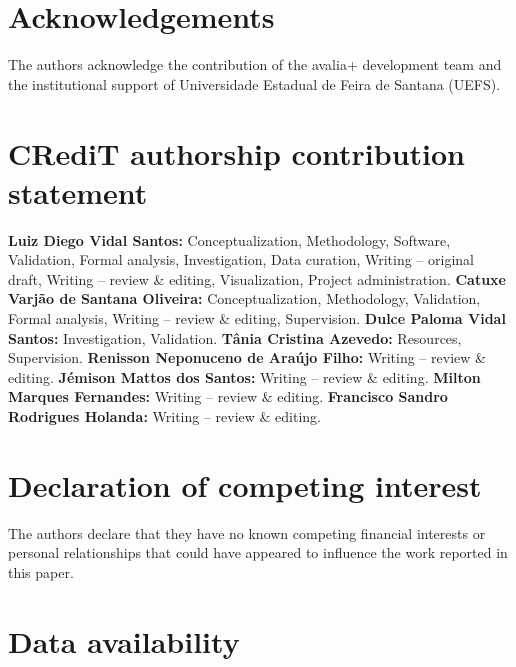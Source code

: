 \documentclass[preprint,12pt,a4paper]{elsarticle}
\begin{document}
\section*{Acknowledgements}

The authors acknowledge the contribution of the avalia+ development team and the institutional support of Universidade Estadual de Feira de Santana (UEFS).

\section*{CRediT authorship contribution statement}

\textbf{Luiz Diego Vidal Santos:} Conceptualization, Methodology, Software, Validation, Formal analysis, Investigation, Data curation, Writing -- original draft, Writing -- review \& editing, Visualization, Project administration. \textbf{Catuxe Varjão de Santana Oliveira:} Conceptualization, Methodology, Validation, Formal analysis, Writing -- review \& editing, Supervision. \textbf{Dulce Paloma Vidal Santos:} Investigation, Validation. \textbf{Tânia Cristina Azevedo:} Resources, Supervision. \textbf{Renisson Neponuceno de Araújo Filho:} Writing -- review \& editing. \textbf{Jémison Mattos dos Santos:} Writing -- review \& editing. \textbf{Milton Marques Fernandes:} Writing -- review \& editing. \textbf{Francisco Sandro Rodrigues Holanda:} Writing -- review \& editing.

\section*{Declaration of competing interest}

The authors declare that they have no known competing financial interests or personal relationships that could have appeared to influence the work reported in this paper.

\section*{Data availability}
\end{document}
